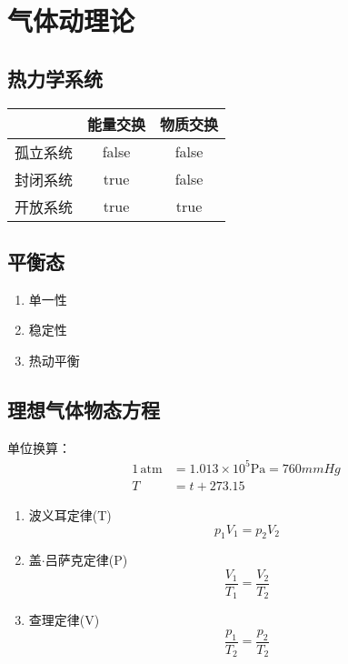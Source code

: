 \chapter{气体动理论}
\newpage

\section{热力学系统}

\begin{table}[!htbp]
    \centering
    \begin{tabular}{lcc}
        \toprule
                 & 能量交换 & 物质交换 \\
        \midrule
        孤立系统 & false    & false    \\
        封闭系统 & true     & false    \\
        开放系统 & true     & true     \\
        \bottomrule
    \end{tabular}
\end{table}

\section{平衡态}

\begin{enumerate}
    \item 单一性
    \item 稳定性
    \item 热动平衡
\end{enumerate}

\section{理想气体物态方程}

单位换算：
\begin{equation}
    \begin{aligned}
        1\,\mathrm{atm} & = 1.013\times10^5 \mathrm{Pa} = 760mmHg \\
        T               & =t+273.15
    \end{aligned}
\end{equation}

\begin{enumerate}
    \item 波义耳定律(T)
          \begin{equation}
              p_1V_1=p_2V_2
          \end{equation}
    \item 盖$\cdot$吕萨克定律(P)
          \begin{equation}
              \frac{V_1}{T_1}=\frac{V_2}{T_2}
          \end{equation}
    \item 查理定律(V)
          \begin{equation}
              \frac{p_1}{T_2}=\frac{p_2}{T_2}
          \end{equation}
\end{enumerate}

